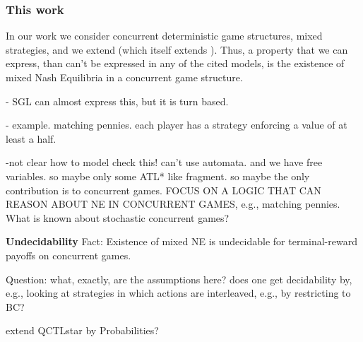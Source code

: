 \subsubsection{This work}

In our work we consider concurrent deterministic game structures, mixed strategies, and we extend \SL (which itself extends \ATLS). Thus, a property that we can express, than can't be expressed in any of the cited models, is the existence of mixed Nash Equilibria in a concurrent game structure. 

- SGL can almost express this, but it is turn based.

- example. matching pennies. each player has a strategy enforcing a value of at least a half. 

-{not clear how to model check this! can't use automata. and we have free variables. so maybe only some ATL* like fragment}. so maybe the only contribution is to concurrent games. FOCUS ON A LOGIC THAT CAN REASON ABOUT NE IN CONCURRENT GAMES, e.g., matching pennies. What is known about stochastic concurrent games?

{\bf Undecidability}
Fact: Existence of mixed NE is undecidable for terminal-reward payoffs on concurrent games.

Question: what, exactly, are the assumptions here? does one get decidability by, e.g., looking at strategies in which actions are interleaved, e.g., by restricting to BC?

extend QCTLstar by Probabilities?
